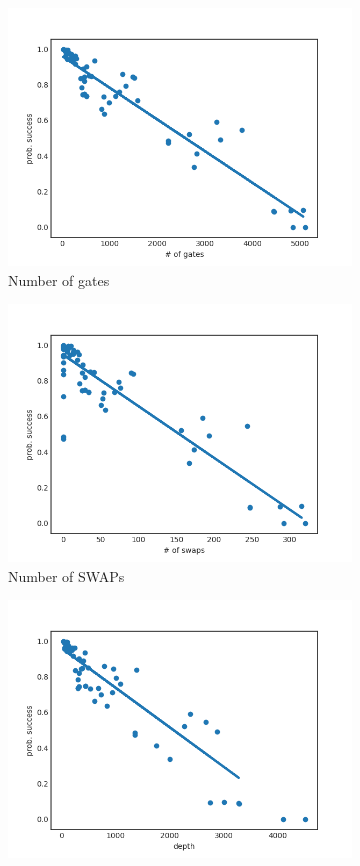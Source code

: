 \documentclass[11pt]{article}
\begin{document}
\begin{figure}[H] 
  \begin{subfigure}[b]{0.5\linewidth}
    \centering
    \includegraphics[width=0.75\linewidth]{ps_g_3000_0} 
    \caption{Number of gates} 
    \label{fig:ps_g_3000_0} 
    \vspace{4ex}
  \end{subfigure}%
  \begin{subfigure}[b]{0.5\linewidth}
   \centering
    \includegraphics[width=0.75\linewidth]{ps_s_3000_0} 
    \caption{Number of SWAPs} 
    \label{fig:ps_s_3000_0} 
    \vspace{4ex}
  \end{subfigure} 
  \begin{subfigure}[b]{0.5\linewidth}
    \centering
    \includegraphics[width=0.75\linewidth]{ps_d_3000_0} 

\end{subfigure}
\end{figure}
\end{document}
